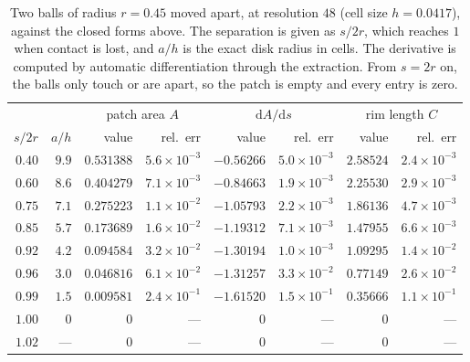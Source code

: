 \documentclass[11pt]{article}
\theoremstyle{definition}
\begin{document}
\begin{table}[htbp]
\centering
\caption{Two balls of radius $r=0.45$ moved apart, at resolution $48$
(cell size $h=0.0417$), against the closed forms above. The separation is
given as $s/2r$, which reaches $1$ when contact is lost, and $a/h$ is the
exact disk radius in cells. The derivative is computed by automatic
differentiation through the extraction. From $s = 2r$ on, the balls only
touch or are apart, so the patch is empty and every entry is zero.}
\label{tab:contact}
\begin{tabular}{@{}rrrrrrrr@{}}
\toprule
& & \multicolumn{2}{c}{patch area $A$} & \multicolumn{2}{c}{$\mathrm{d}A/\mathrm{d}s$} & \multicolumn{2}{c}{rim length $C$} \\
\cmidrule(lr){3-4}\cmidrule(lr){5-6}\cmidrule(l){7-8}
$s/2r$ & $a/h$ & value & rel.\ err & value & rel.\ err & value & rel.\ err \\
\midrule
$0.40$ & $9.9$ & $0.531388$ & $5.6\!\times\!10^{-3}$ & $-0.56266$ & $5.0\!\times\!10^{-3}$ & $2.58524$ & $2.4\!\times\!10^{-3}$ \\
$0.60$ & $8.6$ & $0.404279$ & $7.1\!\times\!10^{-3}$ & $-0.84663$ & $1.9\!\times\!10^{-3}$ & $2.25530$ & $2.9\!\times\!10^{-3}$ \\
$0.75$ & $7.1$ & $0.275223$ & $1.1\!\times\!10^{-2}$ & $-1.05793$ & $2.2\!\times\!10^{-3}$ & $1.86136$ & $4.7\!\times\!10^{-3}$ \\
$0.85$ & $5.7$ & $0.173689$ & $1.6\!\times\!10^{-2}$ & $-1.19312$ & $7.1\!\times\!10^{-3}$ & $1.47955$ & $6.6\!\times\!10^{-3}$ \\
$0.92$ & $4.2$ & $0.094584$ & $3.2\!\times\!10^{-2}$ & $-1.30194$ & $1.0\!\times\!10^{-3}$ & $1.09295$ & $1.4\!\times\!10^{-2}$ \\
$0.96$ & $3.0$ & $0.046816$ & $6.1\!\times\!10^{-2}$ & $-1.31257$ & $3.3\!\times\!10^{-2}$ & $0.77149$ & $2.6\!\times\!10^{-2}$ \\
$0.99$ & $1.5$ & $0.009581$ & $2.4\!\times\!10^{-1}$ & $-1.61520$ & $1.5\!\times\!10^{-1}$ & $0.35666$ & $1.1\!\times\!10^{-1}$ \\
$1.00$ & $0$   & $0$        & ---                    & $0$        & ---                    & $0$       & --- \\
$1.02$ & ---   & $0$        & ---                    & $0$        & ---                    & $0$       & --- \\
\bottomrule
\end{tabular}
\end{table}
\end{document}
